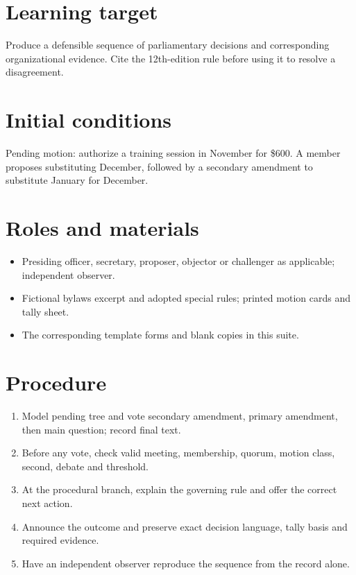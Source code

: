 \documentclass[11pt]{article}
\begin{document}
\SuiteOpen
\section{Learning target}
Produce a defensible sequence of parliamentary decisions and corresponding organizational evidence. Cite the 12th-edition rule before using it to resolve a disagreement.

\section{Initial conditions}
Pending motion: authorize a training session in November for \$600. A member proposes substituting December, followed by a secondary amendment to substitute January for December.

\section{Roles and materials}
\begin{itemize}[leftmargin=*,itemsep=4pt]
\item Presiding officer, secretary, proposer, objector or challenger as applicable; independent observer.
\item Fictional bylaws excerpt and adopted special rules; printed motion cards and tally sheet.
\item The corresponding template forms and blank copies in this suite.
\end{itemize}

\section{Procedure}
\begin{enumerate}[leftmargin=*,itemsep=4pt]
\item Model pending tree and vote secondary amendment, primary amendment, then main question; record final text.
\item Before any vote, check valid meeting, membership, quorum, motion class, second, debate and threshold.
\item At the procedural branch, explain the governing rule and offer the correct next action.
\item Announce the outcome and preserve exact decision language, tally basis and required evidence.
\item Have an independent observer reproduce the sequence from the record alone.
\end{enumerate}
\end{document}
